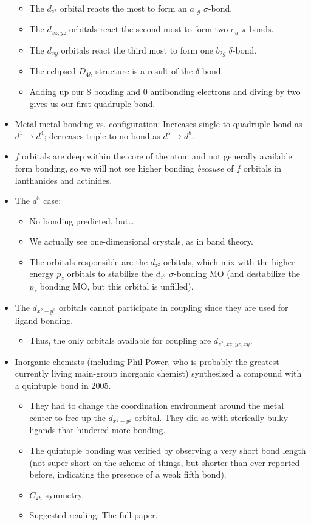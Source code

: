 \documentclass[../notes.tex]{subfiles}
\begin{document}
\begin{itemize}
\begin{itemize}
\begin{itemize}
        \end{itemize}
        \item The $d_{z^2}$ orbital reacts the most to form an $a_{1g}$ $\sigma$-bond.
        \item The $d_{xz,yz}$ orbitals react the second most to form two $e_u$ $\pi$-bonds.
        \item The $d_{xy}$ orbitals react the third most to form one $b_{2g}$ $\delta$-bond.
        \item The eclipsed $D_{4h}$ structure is a result of the $\delta$ bond.
        \item Adding up our 8 bonding and 0 antibonding electrons and diving by two gives us our first quadruple bond.
    \end{itemize}
    \item Metal-metal bonding vs. configuration: Increases single to quadruple bond as $d^1\to d^4$; decreases triple to no bond as $d^5\to d^8$.
    \item $f$ orbitals are deep within the core of the atom and not generally available form bonding, so we will not see higher bonding \emph{because} of $f$ orbitals in lanthanides and actinides.
    \item The $d^8$ case:
    \begin{itemize}
        \item No bonding predicted, but\dots
        \item We actually see one-dimensional crystals, as in band theory.
        \item The orbitals responsible are the $d_{z^2}$ orbitals, which mix with the higher energy $p_z$ orbitals to stabilize the $d_{z^2}$ $\sigma$-bonding MO (and destabilize the $p_z$ bonding MO, but this orbital is unfilled).
    \end{itemize}
    \item The $d_{x^2-y^2}$ orbitals cannot participate in  coupling since they are used for ligand bonding.
    \begin{itemize}
        \item Thus, the only orbitals available for coupling are $d_{z^2,xz,yz,xy}$.
    \end{itemize}
    \item Inorganic chemists (including Phil Power, who is probably the greatest currently living main-group inorganic chemist) synthesized a compound with a quintuple bond in 2005.
    \begin{itemize}
        \item They had to change the coordination environment around the metal center to free up the $d_{x^2-y^2}$ orbital. They did so with sterically bulky ligands that hindered more bonding.
        \item The quintuple bonding was verified by observing a very short bond length (not super short on the scheme of things, but shorter than ever reported before, indicating the presence of a weak fifth bond).
        \item $C_{2h}$ symmetry.
        \item Suggested reading: The full paper.
    \end{itemize}
\end{itemize}
\end{document}
